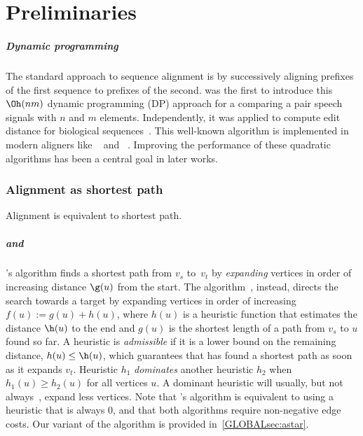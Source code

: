 \chapter{Preliminaries}

\paragraph{Dynamic programming} The standard approach to sequence alignment is
by successively aligning prefixes of the first sequence to prefixes of the
second. \citet{vintsyuk1968speech} was the first to introduce this $\Oh(nm)$
dynamic programming (DP) approach for a comparing a pair speech signals with $n$
and $m$ elements. Independently, it was applied to compute edit distance for
biological
sequences~\citep{needleman1970general,sankoff1972matching,sellers1974theory,wagner1974string}.
This well-known algorithm is implemented in modern aligners  like
\seqan~\citep{reinert2017seqan} and \parasail~\citep{daily2016parasail}.
Improving the performance of these quadratic algorithms has been a central goal
in later works.

\subsection{Alignment as shortest path}

Alignment is equivalent to shortest path.

\paragraph{\dijkstra and \A}
\dijkstra's algorithm \citep{dijkstra1959note} finds a shortest path from $v_s$
to~$v_t$ by \emph{expanding} vertices in order of increasing distance $\g(u)$
from the start. The \A algorithm~\citep{hart1968formal,pearl1984heuristics},
instead, directs the search towards a target by expanding vertices in order of
increasing ${f(u) := g(u) + h(u)}$, where $h(u)$ is a heuristic function that
estimates the distance $\h(u)$ to the end and $g(u)$ is the shortest length of a
path from $v_s$ to $u$ found so far. A heuristic is \emph{admissible} if it is a
lower bound on the remaining distance, $h(u) \leq \h(u)$, which guarantees that
\A has found a shortest path as soon as it expands $v_t$. Heuristic $h_1$
\emph{dominates} another heuristic $h_2$ when $h_1(u) \ge h_2(u)$ for all vertices $u$.
A dominant heuristic will usually, but not always~\citep{holte2010common},
expand less vertices. Note that \dijkstra's algorithm is
equivalent to \A using a heuristic that is always $0$, and that both algorithms
require non-negative edge costs. Our variant of the \A algorithm is provided
in~\cref{GLOBALsec:astar}.

